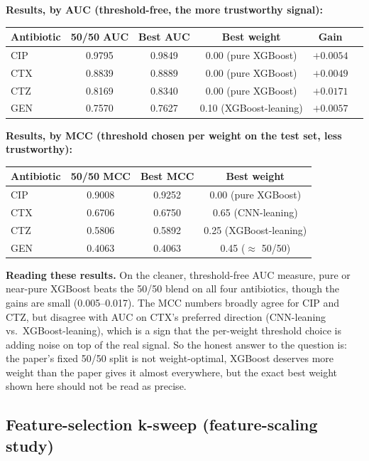 \documentclass[11pt]{article}
\begin{document}
\textbf{Results, by AUC (threshold-free, the more trustworthy signal):}

\begin{center}
\begin{tabular}{lccccl}
\toprule
\textbf{Antibiotic} & \textbf{50/50 AUC} & \textbf{Best AUC} & \textbf{Best weight} & \textbf{Gain} \\
\midrule
CIP & 0.9795 & 0.9849 & 0.00 (pure XGBoost) & $+0.0054$ \\
CTX & 0.8839 & 0.8889 & 0.00 (pure XGBoost) & $+0.0049$ \\
CTZ & 0.8169 & 0.8340 & 0.00 (pure XGBoost) & $+0.0171$ \\
GEN & 0.7570 & 0.7627 & 0.10 (XGBoost-leaning) & $+0.0057$ \\
\bottomrule
\end{tabular}
\end{center}

\textbf{Results, by MCC (threshold chosen per weight on the test set, less trustworthy):}

\begin{center}
\begin{tabular}{lccc}
\toprule
\textbf{Antibiotic} & \textbf{50/50 MCC} & \textbf{Best MCC} & \textbf{Best weight} \\
\midrule
CIP & 0.9008 & 0.9252 & 0.00 (pure XGBoost) \\
CTX & 0.6706 & 0.6750 & 0.65 (CNN-leaning) \\
CTZ & 0.5806 & 0.5892 & 0.25 (XGBoost-leaning) \\
GEN & 0.4063 & 0.4063 & 0.45 ($\approx$ 50/50) \\
\bottomrule
\end{tabular}
\end{center}

\textbf{Reading these results.} On the cleaner, threshold-free AUC measure, pure or near-pure XGBoost beats the 50/50 blend on all four antibiotics, though the gains are small (0.005--0.017). The MCC numbers broadly agree for CIP and CTZ, but disagree with AUC on CTX's preferred direction (CNN-leaning vs.\ XGBoost-leaning), which is a sign that the per-weight threshold choice is adding noise on top of the real signal. So the honest answer to the question is: the paper's fixed 50/50 split is not weight-optimal, XGBoost deserves more weight than the paper gives it almost everywhere, but the exact best weight shown here should not be read as precise.

\subsection{Feature-selection k-sweep (feature-scaling study)}
\end{document}
